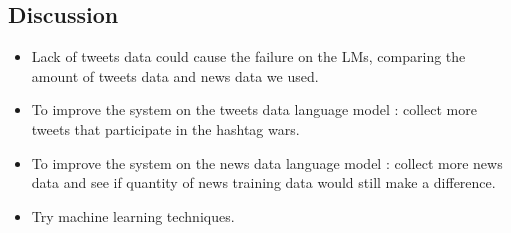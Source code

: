 \documentclass[a0,portrait]{a0poster}
\begin{document}
\begin{multicols}{2}
\section*{\LARGE Discussion}

\begin{itemize}
\item Lack of tweets data could cause the failure on the LMs, comparing the amount of tweets data and news data we used.
\item To improve the system on the tweets data language model : collect more tweets that participate in the hashtag wars. 
\item To improve the system on the news data language model : collect more news data and see if quantity of news training data would still make a difference.
\item Try machine learning techniques.
\end{itemize}




\nocite{*} %
\small  %





\end{multicols}
\end{document}
